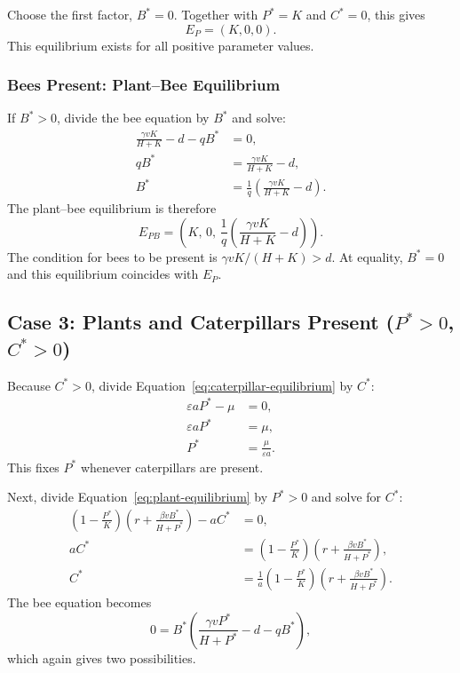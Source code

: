 \documentclass[11pt]{article}
\begin{document}
Choose the first factor, $B^*=0$. Together with $P^*=K$ and $C^*=0$, this gives
\begin{equation}
    E_P=(K,0,0).
\end{equation}
This equilibrium exists for all positive parameter values.

\subsubsection{Bees Present: Plant--Bee Equilibrium}

If $B^*>0$, divide the bee equation by $B^*$ and solve:
\begin{align*}
    \frac{\gamma vK}{H+K}-d-qB^* &= 0, \\
    qB^* &= \frac{\gamma vK}{H+K}-d, \\
    B^* &= \frac{1}{q}\left(\frac{\gamma vK}{H+K}-d\right).
\end{align*}
The plant--bee equilibrium is therefore
\begin{equation}
    E_{PB}=\left(K,\,0,\,
    \frac{1}{q}\left(\frac{\gamma vK}{H+K}-d\right)\right).
\end{equation}
The condition for bees to be present is
$\gamma vK/(H+K)>d$. At equality, $B^*=0$ and this equilibrium coincides
with $E_P$.

\subsection{Case 3: Plants and Caterpillars Present ($P^*>0$, $C^*>0$)}

Because $C^*>0$, divide Equation~\eqref{eq:caterpillar-equilibrium} by $C^*$:
\begin{align*}
    \varepsilon aP^*-\mu &= 0, \\
    \varepsilon aP^* &= \mu, \\
    P^* &= \frac{\mu}{\varepsilon a}.
\end{align*}
This fixes $P^*$ whenever caterpillars are present.

Next, divide Equation~\eqref{eq:plant-equilibrium} by $P^*>0$ and solve for $C^*$:
\begin{align*}
    \left(1-\frac{P^*}{K}\right)
    \left(r+\frac{\beta vB^*}{H+P^*}\right)-aC^* &= 0, \\
    aC^* &= \left(1-\frac{P^*}{K}\right)
    \left(r+\frac{\beta vB^*}{H+P^*}\right), \\
    C^* &= \frac{1}{a}\left(1-\frac{P^*}{K}\right)
    \left(r+\frac{\beta vB^*}{H+P^*}\right).
\end{align*}
The bee equation becomes
\[
    0=B^*\left(\frac{\gamma vP^*}{H+P^*}-d-qB^*\right),
\]
which again gives two possibilities.
\end{document}
